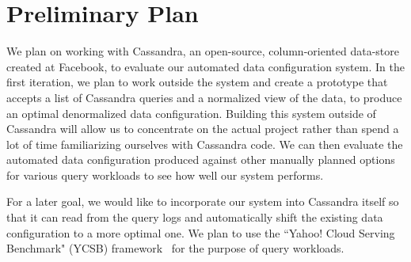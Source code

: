 \documentclass[10pt]{article}
\begin{document}
\section{Preliminary Plan}
We plan on working with Cassandra, an open-source, column-oriented data-store created at Facebook, to evaluate our automated data configuration
system. In the first iteration, we plan to work outside the system and create a prototype that accepts a list of Cassandra queries and a normalized
view of the data, to produce an optimal denormalized data configuration. Building this system outside of Cassandra will allow us to concentrate on 
the actual project rather than spend a lot of time familiarizing ourselves with Cassandra code. We can then evaluate the automated data configuration 
produced against other manually planned options for various query workloads to see how well our system performs.

For a later goal, we would like to incorporate our system into Cassandra itself so that it can read from the query logs and automatically shift 
the existing data configuration to a more optimal one. We plan to use the ``Yahoo! Cloud Serving Benchmark" (YCSB) framework~\cite{ycsb} for the
purpose of query workloads.



\end{document}
